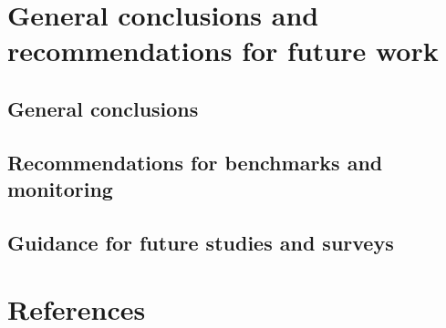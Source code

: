 \documentclass[
  letterpaper,
  DIV=11,
  numbers=noendperiod]{scrartcl}
\begin{document}
\hypertarget{general-conclusions-and-recommendations-for-future-work}{%
\section{General conclusions and recommendations for future
work}\label{general-conclusions-and-recommendations-for-future-work}}

\hypertarget{general-conclusions}{%
\subsection{General conclusions}\label{general-conclusions}}

\hypertarget{recommendations-for-benchmarks-and-monitoring}{%
\subsection{Recommendations for benchmarks and
monitoring}\label{recommendations-for-benchmarks-and-monitoring}}

\hypertarget{guidance-for-future-studies-and-surveys}{%
\subsection{Guidance for future studies and
surveys}\label{guidance-for-future-studies-and-surveys}}

\hypertarget{references}{%
\section{References}\label{references}}
\end{document}
